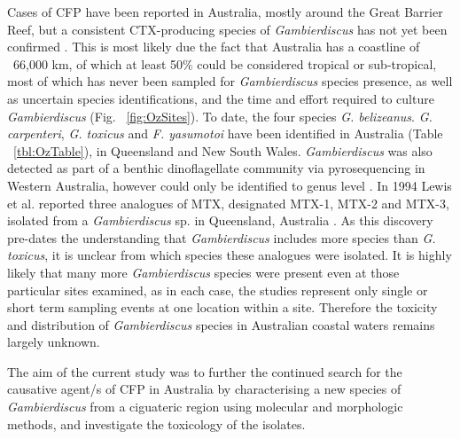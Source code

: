 \documentclass[12pt]{article}
\begin{document}
 
Cases of CFP have been reported in Australia, mostly around the Great Barrier Reef, but a consistent CTX-producing species of \emph{Gambierdiscus} has not yet been confirmed \citep{lewis2006ciguatera}. This is most likely due the fact that Australia has a coastline of ~66,000 km, of which at least 50\% could be considered tropical or sub-tropical, most of which has never been sampled for \textit{Gambierdiscus} species presence, as well as uncertain species identifications, and the time and effort required to  culture \textit{Gambierdiscus}  (Fig. ~\ref{fig:OzSites}). To date,  the four species \emph{G. belizeanus}. \emph{G. carpenteri}, \emph{G. toxicus} and \emph{F. yasumotoi} have been identified in Australia (Table ~\ref{tbl:OzTable}), in Queensland and New South Wales. \emph{Gambierdiscus} was also detected as part of a benthic dinoflagellate community via pyrosequencing in Western Australia, however could only be identified to genus level \citep{kohli2014cob}.
In 1994 Lewis et al. reported three analogues of MTX, designated MTX-1, MTX-2 and MTX-3, isolated from a \emph{Gambierdiscus} sp. in Queensland, Australia \citep{holmes1994purification}. As this discovery pre-dates the understanding that \emph{Gambierdiscus} includes more species than \emph{G. toxicus}, it is unclear from which species these analogues were isolated.  
It is highly likely that many more \emph{Gambierdiscus} species were present even at those particular sites examined, as in each case, the studies represent only single or short term sampling events at one location within a site. Therefore the toxicity and distribution of \emph{Gambierdiscus} species in Australian coastal waters remains largely unknown. %

The aim of the current study was to further the continued search for the causative agent/s of CFP in Australia by characterising a new species of \emph{Gambierdiscus} from a ciguateric region using molecular and morphologic methods, and investigate the toxicology of the isolates.
\end{document}
